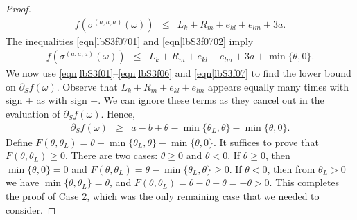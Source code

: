 \documentclass[reqno]{amsart}
\begin{document}
\begin{proof}
\begin{eqnarray}
f(\sigma^{(a,a,a)}(\omega))&\leq& L_k+R_m+e_{kl}+e_{lm}+3a.\label{eqn|lbS3f0702}
\end{eqnarray}
The inequalities \eqref{eqn|lbS3f0701} and \eqref{eqn|lbS3f0702} imply 
\begin{eqnarray}
f(\sigma^{(a,a,a)}(\omega))&\leq& L_k+R_m+e_{kl}+e_{lm}+3a+\min\{\theta,0\}. \label{eqn|lbS3f07}
\end{eqnarray}
We now use \eqref{eqn|lbS3f01}--\eqref{eqn|lbS3f06} and \eqref{eqn|lbS3f07} to find the lower bound on $\partial_Sf(\omega)$. Observe that $L_k+R_m+e_{kl}+e_{lm}$ appears equally many times with sign $+$ as with sign $-$. We can ignore these terms as they cancel out in the evaluation of $\partial_Sf(\omega)$. Hence, 
\begin{eqnarray}
\partial_Sf(\omega)&\geq&   a    -b+\theta -\min\{\theta_L,\theta\} -\min\{\theta,0\}. \label{eqn|lbS3AlmostDone}
\end{eqnarray}
Define
$F(\theta,\theta_L)=\theta- \min\{\theta_L,\theta\}-\min\{\theta,0\}$. It suffices to prove that $F(\theta,\theta_L)\geq 0$. 
There are two cases: $\theta\geq 0$ and $\theta<0$. If $\theta\geq 0$, then $\min\{\theta,0\}=0$ and $F(\theta,\theta_L)=\theta-\min\{\theta_L,\theta\}\geq 0$. 
If $\theta <0$, then from $\theta_L>0$ we have $\min\{\theta,\theta_L\}=\theta$, and  
$F(\theta,\theta_L)=\theta-\theta-\theta=-\theta>0$. This completes the proof of Case 2, which was the only remaining case that we needed to consider.
\end{proof}
\end{document}
